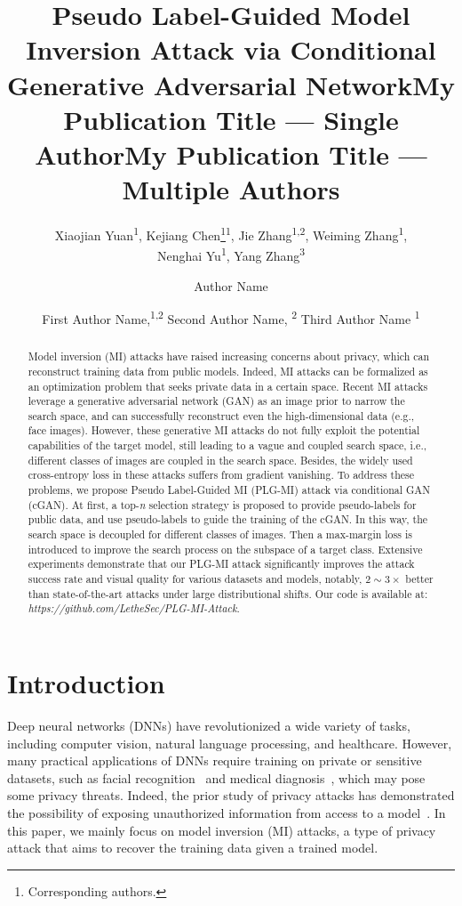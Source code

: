 \documentclass[letterpaper]{article} %
\title{Pseudo Label-Guided Model Inversion Attack via Conditional Generative Adversarial Network}
\author{
    Xiaojian Yuan\textsuperscript{\rm 1},
    Kejiang Chen\footnote{Corresponding authors.}\textsuperscript{\rm 1},
    Jie Zhang\textsuperscript{\rm 1,2},
    Weiming Zhang\textsuperscript{\rm 1}, \\
    Nenghai Yu\textsuperscript{\rm 1},
    Yang Zhang\textsuperscript{\rm 3}
}
\title{My Publication Title --- Single Author}
\author {
    Author Name
}
\title{My Publication Title --- Multiple Authors}
\author {
    First Author Name,\textsuperscript{\rm 1,\rm 2}
    Second Author Name, \textsuperscript{\rm 2}
    Third Author Name \textsuperscript{\rm 1}
}
\begin{document}
\maketitle

\begin{abstract}
Model inversion (MI) attacks have raised increasing concerns about privacy, which can reconstruct training data from public models. Indeed, MI attacks can be formalized as an optimization problem that seeks private data in a certain space. Recent MI attacks leverage a generative adversarial network (GAN) as an image prior to narrow the search space, and can successfully reconstruct even the high-dimensional data (e.g., face images). However, these generative MI attacks do not fully exploit the potential capabilities of the target model, still leading to a vague and coupled search space, i.e., different classes of images are coupled in the search space. Besides, the widely used cross-entropy loss in these attacks suffers from gradient vanishing. To address these problems, we propose Pseudo Label-Guided MI (PLG-MI) attack via conditional GAN (cGAN). At first, a top-\emph{n} selection strategy is proposed to provide pseudo-labels for public data, and use pseudo-labels to guide the training of the cGAN. In this way, the search space is decoupled for different classes of images. Then a max-margin loss is introduced to improve the search process on the subspace of a target class. Extensive experiments demonstrate that our PLG-MI attack significantly improves the attack success rate and visual quality for various datasets and models, notably, $2\sim3 \times$ better than state-of-the-art attacks under large distributional shifts.
Our code is available at: \textit{https://github.com/LetheSec/PLG-MI-Attack}.
\end{abstract}



\section{Introduction}\label{sec:intro}

Deep neural networks (DNNs) have revolutionized a wide variety of tasks, including computer vision, natural language processing, and healthcare. However, many practical applications of DNNs require training on private or sensitive datasets, such as facial recognition~\cite{taigman2014deepface} and medical diagnosis~\cite{rajpurkar2017chexnet}, which may pose some privacy threats.
Indeed, the prior study of privacy attacks has demonstrated the possibility of exposing unauthorized information from access to a model~\cite{shokri2017membership, gopinath2019property, tramer2016stealing, fredrikson2015model}.
In this paper, we mainly focus on model inversion (MI) attacks, a type of privacy attack that aims to recover the training data given a trained model.
\end{document}
